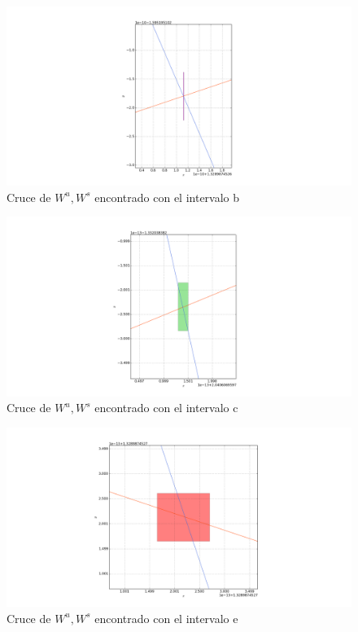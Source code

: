 \begin{figure}[H]
\centering
\includegraphics[scale=0.4]{cruce2}
\caption{Cruce de $W^{u},W^{s}$ encontrado con el intervalo b}
\label{cruce2H}
\end{figure}


\begin{figure}[H]
\centering
\includegraphics[scale=0.4]{cruce3}
\caption{Cruce de $W^{u},W^{s}$ encontrado con el intervalo c }
\label{cruce3H}
\end{figure}


\begin{figure}[H]
\centering
\includegraphics[scale=0.4]{cruce5}
\caption{Cruce de $W^{u},W^{s}$ encontrado con el intervalo e }
\label{cruce5H}
\end{figure}

